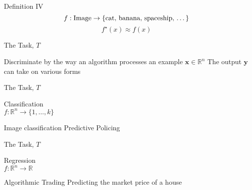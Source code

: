\begin{slide}{Definition IV}
  $$f: \text{Image} \rightarrow \{\text{cat, banana, spaceship, \dots}\}$$
  \vspace{0.5cm}
  \pause
  $$f^\star(x) \approx f(x)$$
\end{slide}

\begin{slide}{The Task, $T$}
\begin{itemize}
  \pitem Discriminate by the way an algorithm processes an example $\textbf{x} \in \mathbb{R}^n$
  \pitem The output $\textbf{y}$ can take on various forms
\end{itemize}
\end{slide}

\begin{slide}{The Task, $T$}
  \begin{center}
    {\Large
    Classification}\\
    \vspace{0.3cm}
    $f: \mathbb{R}^n \rightarrow \{1, \dots, k\}$
  \end{center}
  \begin{itemize}
    \pitem Image classification
    \pitem Predictive Policing %
  \end{itemize}
\end{slide}

\begin{slide}{The Task, $T$}
  \begin{center}
    {\Large
    Regression}\\
    \vspace{0.3cm}
    $f: \mathbb{R}^n \rightarrow \mathbb{R}$
  \end{center}
  \begin{itemize}
    \pitem Algorithmic Trading %
    \pitem Predicting the market price of a house %
  \end{itemize}
\end{slide}

